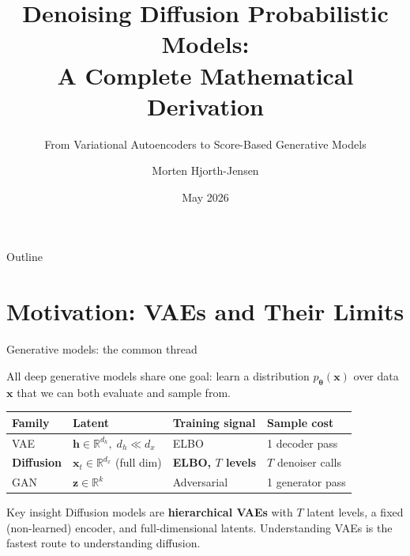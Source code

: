 \documentclass[aspectratio=169,11pt]{beamer}
\title[Diffusion Models]{Denoising Diffusion Probabilistic Models:\\
       A Complete Mathematical Derivation}
\subtitle{From Variational Autoencoders to Score-Based Generative Models}
\author[M.\ Hjorth-Jensen]{Morten Hjorth-Jensen}
\institute[UiO/MSU]{Department of Physics \& CCSE, University of Oslo\\
                    \& Michigan State University}
\date{May 2026}
\newcommand{\R}{\mathbb{R}}
\newcommand{\bx}{\bm{x}}
\newcommand{\bh}{\bm{h}}
\newcommand{\bz}{\bm{z}}
\newcommand{\btheta}{\bm{\theta}}
\begin{document}

\begin{frame}[plain]
  \titlepage
\end{frame}

\begin{frame}{Outline}
  \tableofcontents
\end{frame}

\section{Motivation: VAEs and Their Limits}

\begin{frame}{Generative models: the common thread}

All deep generative models share one goal: learn a distribution
$p_{\btheta}(\bx)$ over data~$\bx$ that we can both evaluate and sample from.

\medskip
\begin{center}
\renewcommand{\arraystretch}{1.25}
\begin{tabular}{llll}
\toprule
\textbf{Family} & \textbf{Latent} & \textbf{Training signal} & \textbf{Sample cost}\\
\midrule
VAE            & $\bh \in \R^{d_h},\;d_h\!\ll\!d_x$ & ELBO             & 1 decoder pass\\
\textbf{Diffusion} & $\bx_t\in\R^{d_x}$ (full dim)  & \textbf{ELBO, $T$ levels} & $T$ denoiser calls\\
GAN            & $\bz\in\R^k$                       & Adversarial      & 1 generator pass\\
\bottomrule
\end{tabular}
\end{center}

\medskip
\begin{alertblock}{Key insight}
Diffusion models are \textbf{hierarchical VAEs} with $T$ latent levels,
a fixed (non-learned) encoder, and full-dimensional latents.
Understanding VAEs is the fastest route to understanding diffusion.
\end{alertblock}
\end{frame}
\end{document}
